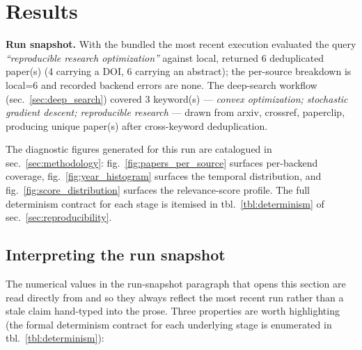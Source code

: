 \documentclass[
]{article}
\newcounter{none} %
\begin{document}
\newpage

\section{Results}\label{sec:results}

\textbf{Run snapshot.} With the bundled 
the most recent execution evaluated the query \emph{``reproducible
research optimization''} against local, returned 6 deduplicated paper(s)
(4 carrying a DOI, 6 carrying an abstract); the per-source breakdown is
local=6 and recorded backend errors are none. The deep-search workflow
(sec.~\ref{sec:deep_search}) covered 3 keyword(s) --- \emph{convex
optimization; stochastic gradient descent; reproducible research} ---
drawn from arxiv, crossref, paperclip, producing unique paper(s) after
cross-keyword deduplication.

The diagnostic figures generated for this run are catalogued in
sec.~\ref{sec:methodology}: fig.~\ref{fig:papers_per_source} surfaces
per-backend coverage, fig.~\ref{fig:year_histogram} surfaces the
temporal distribution, and fig.~\ref{fig:score_distribution} surfaces
the relevance-score profile. The full determinism contract for each
stage is itemised in tbl.~\ref{tbl:determinism} of
sec.~\ref{sec:reproducibility}.

\subsection{Interpreting the run
snapshot}\label{interpreting-the-run-snapshot}

The numerical values in the run-snapshot paragraph that opens this
section are read directly from  and
 so they always reflect
the most recent run rather than a stale claim hand-typed into the prose.
Three properties are worth highlighting (the formal determinism contract
for each underlying stage is enumerated in tbl.~\ref{tbl:determinism}):
\end{document}

